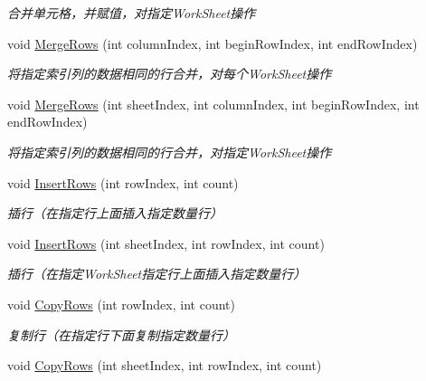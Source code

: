 \begin{DoxyCompactItemize}
\begin{DoxyCompactList}\small\item\em 合并单元格，并赋值，对指定\-Work\-Sheet操作 \end{DoxyCompactList}\item 
void \hyperlink{class_x_c_l_net_tools_1_1_office_1_1_excel_handler_1_1_excel_helper_a6e130b3596ed54ce811fa500ff4df20b}{Merge\-Rows} (int column\-Index, int begin\-Row\-Index, int end\-Row\-Index)
\begin{DoxyCompactList}\small\item\em 将指定索引列的数据相同的行合并，对每个\-Work\-Sheet操作 \end{DoxyCompactList}\item 
void \hyperlink{class_x_c_l_net_tools_1_1_office_1_1_excel_handler_1_1_excel_helper_acbca99c07c2d2b210e1709660d383b97}{Merge\-Rows} (int sheet\-Index, int column\-Index, int begin\-Row\-Index, int end\-Row\-Index)
\begin{DoxyCompactList}\small\item\em 将指定索引列的数据相同的行合并，对指定\-Work\-Sheet操作 \end{DoxyCompactList}\item 
void \hyperlink{class_x_c_l_net_tools_1_1_office_1_1_excel_handler_1_1_excel_helper_a2d4906537fdb886329ba5dbdfe82ed18}{Insert\-Rows} (int row\-Index, int count)
\begin{DoxyCompactList}\small\item\em 插行（在指定行上面插入指定数量行） \end{DoxyCompactList}\item 
void \hyperlink{class_x_c_l_net_tools_1_1_office_1_1_excel_handler_1_1_excel_helper_ae52b03c158a2db80aa61b3db05e9298c}{Insert\-Rows} (int sheet\-Index, int row\-Index, int count)
\begin{DoxyCompactList}\small\item\em 插行（在指定\-Work\-Sheet指定行上面插入指定数量行） \end{DoxyCompactList}\item 
void \hyperlink{class_x_c_l_net_tools_1_1_office_1_1_excel_handler_1_1_excel_helper_a7e024058407b8033da3728d18a100dc1}{Copy\-Rows} (int row\-Index, int count)
\begin{DoxyCompactList}\small\item\em 复制行（在指定行下面复制指定数量行） \end{DoxyCompactList}\item 
void \hyperlink{class_x_c_l_net_tools_1_1_office_1_1_excel_handler_1_1_excel_helper_ae5ca11d360518bfcf0ec30506120adfb}{Copy\-Rows} (int sheet\-Index, int row\-Index, int count)

\end{DoxyCompactItemize}

